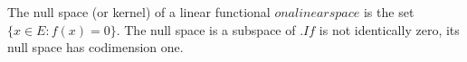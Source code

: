 The null space (or kernel) of a linear functional $ on a linear space $ is the set $\{x \in E : f(x) = 0\}$. The null space is a subspace of $. If $ is not identically zero, its null space has codimension one.
